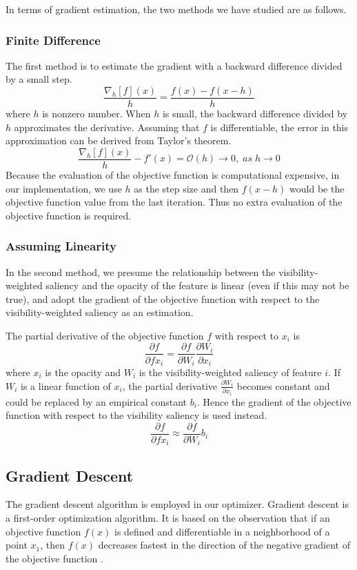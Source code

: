 In terms of gradient estimation, the two methods we have studied are as follows.

\subsubsection{Finite Difference}
The first method is to estimate the gradient with a backward difference divided by a small step.
\[ \frac{\nabla_{h}[f](x)}{h}=\frac{f(x)-f(x-h)}{h} \]
where $ h $ is nonzero number.
When $ h $ is small, the backward difference divided by $ h $ approximates the derivative. Assuming that $ f $ is differentiable, the error in this approximation can be derived from Taylor's theorem.
\[ \frac{\nabla_{h}[f](x)}{h}-f'(x)=\mathcal{O}(h) \to 0 , \; as \; h \to 0 \]
Because the evaluation of the objective function is computational expensive, in our implementation, we use $ h $ as the step size and then $ f(x-h) $ would be the objective function value from the last iteration. Thus no extra evaluation of the objective function is required.

\subsubsection{Assuming Linearity}
In the second method, we presume the relationship between the visibility-weighted saliency and the opacity of the feature is linear (even if this may not be true), and adopt the gradient of the objective function with respect to the visibility-weighted saliency as an estimation.

The partial derivative of the objective function $ f $ with respect to $ x_{i} $ is
\[ \frac{\partial f}{\partial f x_{i}} = \frac{\partial f}{\partial W_{i}} \frac{\partial W_{i}}{\partial x_{i}} \]
where $ x_{i} $ is the opacity and $ W_{i} $ is the visibility-weighted saliency of feature $ i $.
If $ W_{i} $ is a linear function of $ x_{i} $, the partial derivative $ \frac{\partial W_{i}}{\partial x_{i}} $ becomes constant and could be replaced by an empirical constant $ b_{i} $. Hence the gradient of the objective function with respect to the visibility saliency is used instead.
\[ \frac{\partial f}{\partial f x_{i}} \approx \frac{\partial f}{\partial W_{i}} b_{i} \]

\subsection{Gradient Descent}
The gradient descent algorithm is employed in our optimizer.
Gradient descent is a first-order optimization algorithm. It is based on the observation that if an objective function $ f(x) $ is defined and differentiable in a neighborhood of a point $ x_{1} $, then $ f(x) $ decreases fastest in the direction of the negative gradient of the objective function \cite{chong_introduction_2013}.

